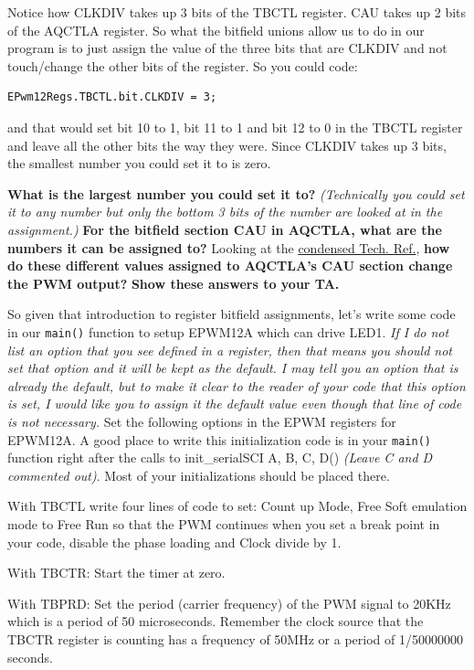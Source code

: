 \documentclass[11pt]{article}
\begin{document}
%
Notice how CLKDIV takes up 3 bits of the TBCTL register. CAU takes up 2 bits of the AQCTLA register. So what the bitfield unions allow us to do in our program is to just assign the value of the three bits that are CLKDIV and not touch/change the other bits of the register. So you could code:
%
\begin{verbatim}
EPwm12Regs.TBCTL.bit.CLKDIV = 3;
\end{verbatim}
%
and that would set bit 10 to 1, bit 11 to 1 and bit 12 to 0 in the TBCTL register and leave all the other bits the way they were. Since CLKDIV takes up 3 bits, the smallest number you could set it to is zero.
%
\begin{checkoff}
        \textbf{What is the largest number you could set it to?} \textit{(Technically you could set it to any number but only the bottom 3 bits of the number are looked at in the assignment.)} \textbf{For the bitfield section CAU in AQCTLA, what are the numbers it can be assigned to?} Looking at the \href{http://coecsl.ece.illinois.edu/SE423/EPWM_Peripheral.pdf}{condensed Tech. Ref.}, \textbf{how do these different values assigned to AQCTLA’s CAU section change the PWM output?} \textbf{Show these answers to your TA.}
\end{checkoff}
%
So given that introduction to register bitfield assignments, let’s write some code in our \texttt{main()} function to setup EPWM12A which can drive LED1. \textit{If I do not list an option that you see defined in a register, then that means you should not set that option and it will be kept as the default. I may tell you an option that is already the default, but to make it clear to the reader of your code that this option is set, I would like you to assign it the default value even though that line of code is not necessary.} Set the following options in the EPWM registers for EPWM12A. A good place to write this initialization code is in your \texttt{main()} function right after the calls to init\_serialSCI A, B, C, D() \textit{(Leave C and D commented out)}. Most of your initializations should be placed there.

With TBCTL write four lines of code to set: Count up Mode, Free Soft emulation mode to Free Run so that the PWM continues when you set a break point in your code, disable the phase loading and Clock divide by 1.

With TBCTR: Start the timer at zero.

With TBPRD: Set the period (carrier frequency) of the PWM signal to 20KHz which is a period of 50 microseconds. Remember the clock source that the TBCTR register is counting has a frequency of 50MHz or a period of 1/50000000 seconds.
\end{document}
